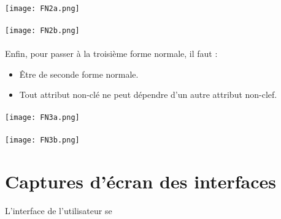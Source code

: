 \documentclass[a4paper,12pt,titlepage]{report}
\begin{document}
\paragraph*{}

\texttt{[image: FN2a.png]}

\paragraph*{}

\texttt{[image: FN2b.png]}

\newpage

\paragraph*{}

Enfin, pour passer à la troisième forme normale, il faut :
\begin{itemize}
\item Être de seconde forme normale.
\item Tout attribut non-clé ne peut dépendre d'un autre attribut non-clef.
\end{itemize}

\paragraph*{}

\texttt{[image: FN3a.png]}

\paragraph*{}

\texttt{[image: FN3b.png]}


\section{Captures d'écran des interfaces}

L'interface de l'utilisateur se
\end{document}
